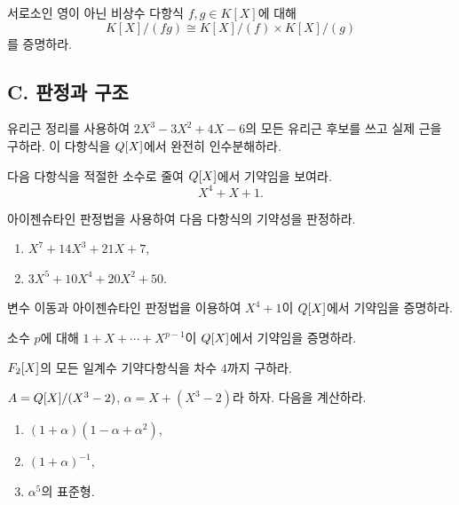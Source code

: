 \begin{exercise}[*]
서로소인 영이 아닌 비상수 다항식 $f,g\in K[X]$에 대해
\[
 K[X]/(fg)\cong K[X]/(f)\times K[X]/(g)
\]
를 증명하라.
\end{exercise}

\subsection*{C. 판정과 구조}

\begin{exercise}[*]
유리근 정리를 사용하여 $2X^3-3X^2+4X-6$의 모든 유리근 후보를 쓰고 실제 근을 구하라. 이 다항식을 $Q[X]$에서 완전히 인수분해하라.
\end{exercise}

\begin{exercise}
다음 다항식을 적절한 소수로 줄여 $Q[X]$에서 기약임을 보여라.
\[
  X^4+X+1.
\]
\end{exercise}

\begin{exercise}[*]
아이젠슈타인 판정법을 사용하여 다음 다항식의 기약성을 판정하라.
\begin{enumerate}[label=(\alph*)]
  \item $X^7+14X^3+21X+7$,
  \item $3X^5+10X^4+20X^2+50$.
\end{enumerate}
\end{exercise}

\begin{exercise}[*]
변수 이동과 아이젠슈타인 판정법을 이용하여 $X^4+1$이 $Q[X]$에서 기약임을 증명하라.
\end{exercise}

\begin{exercise}
소수 $p$에 대해 $1+X+\cdots+X^{p-1}$이 $Q[X]$에서 기약임을 증명하라.
\end{exercise}

\begin{exercise}[*]
$F_2[X]$의 모든 일계수 기약다항식을 차수 $4$까지 구하라.
\end{exercise}

\begin{exercise}
$A=Q[X]/(X^3-2)$, $\alpha=X+(X^3-2)$라 하자. 다음을 계산하라.
\begin{enumerate}[label=(\alph*)]
  \item $(1+\alpha)(1-\alpha+\alpha^2)$,
  \item $(1+\alpha)^{-1}$,
  \item $\alpha^5$의 표준형.
\end{enumerate}
\end{exercise}

